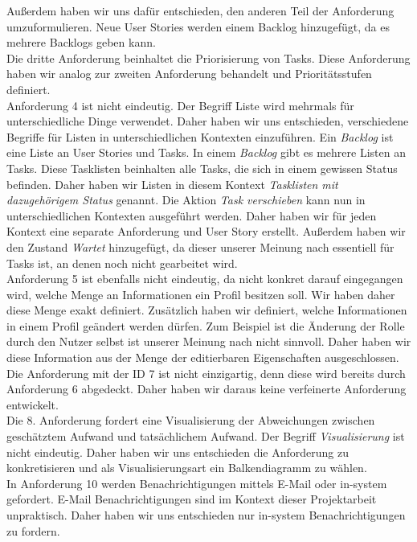 \documentclass{article}
\begin{document}
Außerdem haben wir uns dafür entschieden, den anderen Teil der Anforderung umzuformulieren.
Neue User Stories werden einem Backlog hinzugefügt, da es mehrere Backlogs geben kann.\\
Die dritte Anforderung beinhaltet die Priorisierung von Tasks.
Diese Anforderung haben wir analog zur zweiten Anforderung behandelt und Prioritätsstufen definiert.\\
Anforderung 4 ist nicht eindeutig.
Der Begriff Liste wird mehrmals für unterschiedliche Dinge verwendet.
Daher haben wir uns entschieden, verschiedene Begriffe für Listen in unterschiedlichen Kontexten einzuführen.
Ein \textit{Backlog} ist eine Liste an User Stories und Tasks.
In einem \textit{Backlog} gibt es mehrere Listen an Tasks.
Diese Tasklisten beinhalten alle Tasks, die sich in einem gewissen Status befinden.
Daher haben wir Listen in diesem Kontext \textit{Tasklisten mit dazugehörigem Status} genannt.
Die Aktion \textit{Task verschieben} kann nun in unterschiedlichen Kontexten ausgeführt werden.
Daher haben wir für jeden Kontext eine separate Anforderung und User Story erstellt.
Außerdem haben wir den Zustand \textit{Wartet} hinzugefügt, da dieser unserer Meinung nach essentiell für Tasks ist, an denen noch nicht gearbeitet wird.\\
Anforderung 5 ist ebenfalls nicht eindeutig, da nicht konkret darauf eingegangen wird, welche Menge an Informationen ein Profil besitzen soll.
Wir haben daher diese Menge exakt definiert.
Zusätzlich haben wir definiert, welche Informationen in einem Profil geändert werden dürfen.
Zum Beispiel ist die Änderung der Rolle durch den Nutzer selbst ist unserer Meinung nach nicht sinnvoll.
Daher haben wir diese Information aus der Menge der editierbaren Eigenschaften ausgeschlossen.\\
Die Anforderung mit der ID 7 ist nicht einzigartig, denn diese wird bereits durch Anforderung 6 abgedeckt.
Daher haben wir daraus keine verfeinerte Anforderung entwickelt.\\
Die 8. Anforderung fordert eine Visualisierung der Abweichungen zwischen geschätztem Aufwand und tatsächlichem Aufwand.
Der Begriff \textit{Visualisierung} ist nicht eindeutig.
Daher haben wir uns entschieden die Anforderung zu konkretisieren und als Visualisierungsart ein Balkendiagramm zu wählen.\\
In Anforderung 10 werden Benachrichtigungen mittels E-Mail oder in-system gefordert.
E-Mail Benachrichtigungen sind im Kontext dieser Projektarbeit unpraktisch.
Daher haben wir uns entschieden nur in-system Benachrichtigungen zu fordern.\\
\end{document}
